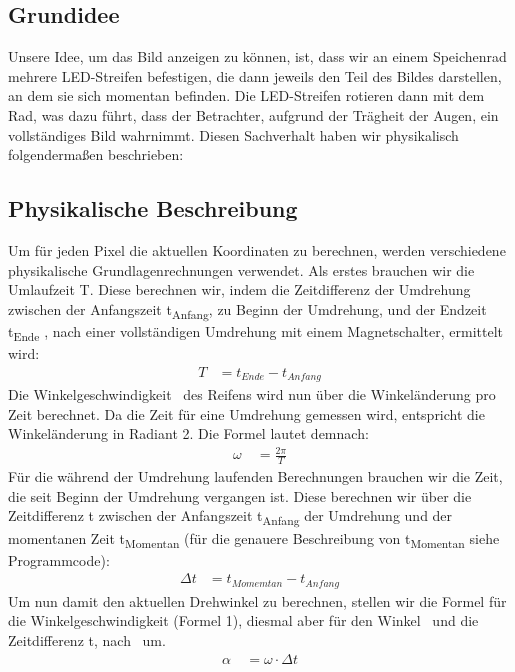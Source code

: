 \documentclass [a4paper, 11pt] {article}
\begin{document}
\subsection{Grundidee}
Unsere Idee, um das Bild anzeigen zu können, ist, dass wir an einem Speichenrad mehrere LED-Streifen befestigen, die dann jeweils den Teil des Bildes darstellen, an dem sie sich momentan befinden. Die LED-Streifen rotieren dann mit dem Rad, was dazu führt, dass der Betrachter, aufgrund der Trägheit der Augen, ein vollständiges Bild wahrnimmt.
Diesen Sachverhalt haben wir physikalisch folgendermaßen beschrieben:

\subsection{Physikalische Beschreibung}
Um für jeden Pixel die aktuellen Koordinaten zu berechnen, werden verschiedene physikalische Grundlagenrechnungen verwendet.
Als erstes brauchen wir die Umlaufzeit T. Diese berechnen wir, indem die Zeitdifferenz der Umdrehung zwischen der Anfangszeit t\textsubscript{Anfang}, zu Beginn der Umdrehung, und der Endzeit t\textsubscript{Ende} , nach einer vollständigen Umdrehung mit einem Magnetschalter, ermittelt wird:
\begin{align}
T &= t_{Ende} - t_{Anfang}
\end{align}
Die Winkelgeschwindigkeit \textomega\ des Reifens wird nun über die Winkeländerung pro Zeit berechnet. Da die Zeit für eine Umdrehung gemessen wird, entspricht die Winkeländerung in Radiant 2\textpi. Die Formel lautet demnach:
\begin{align}
\omega\ &= \frac{2 \pi}{T}
\end{align}
Für die während der Umdrehung laufenden Berechnungen brauchen wir die Zeit, die seit Beginn der Umdrehung vergangen ist. Diese berechnen wir über die Zeitdifferenz \textDelta t zwischen der Anfangszeit t\textsubscript{Anfang} der Umdrehung und der momentanen Zeit t\textsubscript{Momentan} (für die genauere Beschreibung von t\textsubscript{Momentan} siehe Programmcode):
\begin{align}
\Delta t &= t_{Momemtan} - t_{Anfang}
\end{align}
Um nun damit den aktuellen Drehwinkel zu berechnen, stellen wir die Formel für die Winkelgeschwindigkeit (Formel 1), diesmal aber für den Winkel \textalpha\  und die Zeitdifferenz \textDelta t, nach \textalpha\  um.  
\begin{align}
\alpha\ &= \omega \cdot \Delta t 
\end{align}
\end{document}
